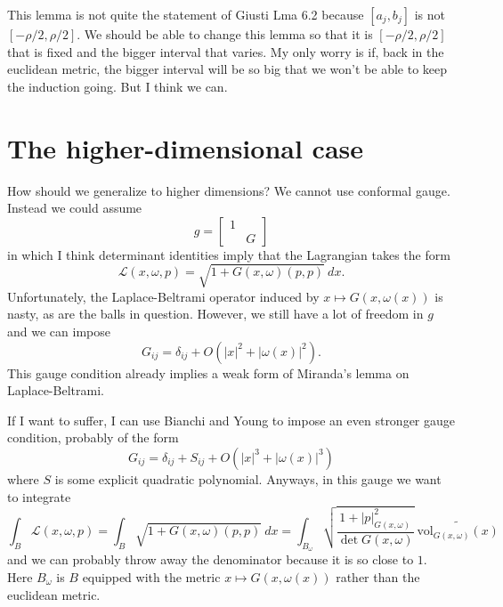 \documentclass[reqno,12pt,letterpaper]{amsart}
\newcommand{\vol}{\mathrm{vol}}
\theoremstyle{definition}
\numberwithin{equation}{section}
\begin{document}
This lemma is not quite the statement of Giusti Lma 6.2 because $[a_j, b_j]$ is not $[-\rho/2, \rho/2]$.
We should be able to change this lemma so that it is $[-\rho/2, \rho/2]$ that is fixed and the bigger interval that varies.
My only worry is if, back in the euclidean metric, the bigger interval will be so big that we won't be able to keep the induction going.
But I think we can.

\section{The higher-dimensional case}
How should we generalize to higher dimensions?
We cannot use conformal gauge. Instead we could assume
$$g = \begin{bmatrix}1 \\ & G\end{bmatrix}$$
in which I think determinant identities imply that the Lagrangian takes the form
$$\mathscr L(x, \omega, p) = \sqrt{1 + G(x, \omega)(p, p)} ~dx.$$
Unfortunately, the Laplace-Beltrami operator induced by $x \mapsto G(x, \omega(x))$ is nasty, as are the balls in question.
However, we still have a lot of freedom in $g$ and we can impose
$$G_{ij} = \delta_{ij} + O(|x|^2 + |\omega(x)|^2).$$
This gauge condition already implies a weak form of Miranda's lemma on Laplace-Beltrami.

If I want to suffer, I can use Bianchi and Young to impose an even stronger gauge condition, probably of the form
$$G_{ij} = \delta_{ij} + S_{ij} + O(|x|^3 + |\omega(x)|^3)$$
where $S$ is some explicit quadratic polynomial.
Anyways, in this gauge we want to integrate
$$\int_B \mathscr L(x, \omega, p) = \int_B \sqrt{1 + G(x, \omega)(p, p)} ~dx = \int_{B_\omega} \sqrt{\frac{1 + |p|_{G(x, \omega)}^2}{\det G(x, \omega)}} ~\widetilde{\vol_{G(x, \omega)}(x)}$$
and we can probably throw away the denominator because it is so close to $1$.
Here $B_\omega$ is $B$ equipped with the metric $x \mapsto G(x, \omega(x))$ rather than the euclidean metric.

\printbibliography
\end{document}
